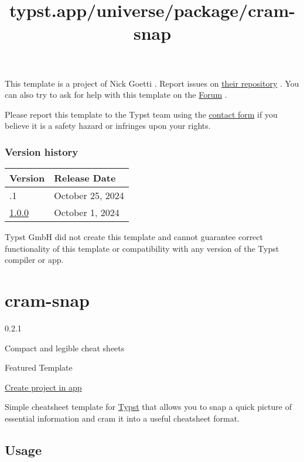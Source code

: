 This template is a project of Nick Goetti . Report issues on
\href{https://github.com/ngoetti/knowledge-key}{their repository} . You
can also try to ask for help with this template on the
\href{https://forum.typst.app}{Forum} .

Please report this template to the Typst team using the
\href{https://typst.app/contact}{contact form} if you believe it is a
safety hazard or infringes upon your rights.

\label{versions}
\subsubsection{Version history}\label{version-history}

\begin{longtable}[]{@{}ll@{}}
\toprule\noalign{}
Version & Release Date \\
\midrule\noalign{}
\endhead
\bottomrule\noalign{}
\endlastfoot
1.0.1 & October 25, 2024 \\
\href{https://typst.app/universe/package/knowledge-key/1.0.0/}{1.0.0} &
October 1, 2024 \\
\end{longtable}

Typst GmbH did not create this template and cannot guarantee correct
functionality of this template or compatibility with any version of the
Typst compiler or app.


\title{typst.app/universe/package/cram-snap}

\label{banner}
\label{template-thumbnail}

\section{cram-snap}\label{cram-snap}

{ 0.2.1 }

Compact and legible cheat sheets

{ } Featured Template

\href{/app?template=cram-snap&version=0.2.1}{Create project in app}

\label{readme}
Simple cheatsheet template for \href{https://typst.app/}{Typst} that
allows you to snap a quick picture of essential information and cram it
into a useful cheatsheet format.

\subsection{Usage}\label{usage}

